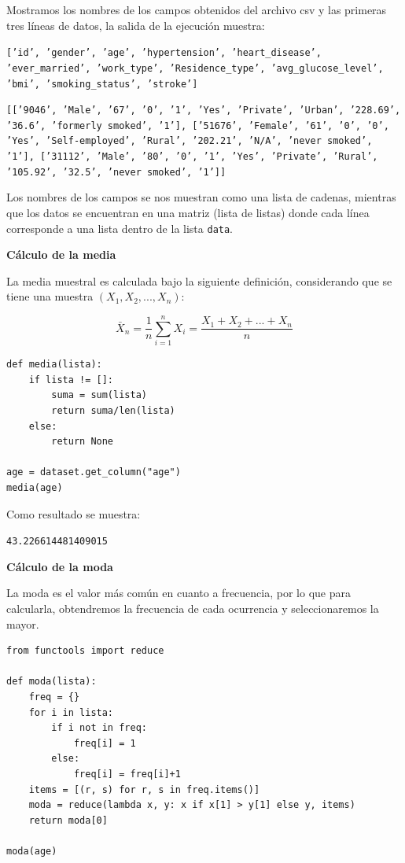 \documentclass[letter]{article}
\begin{document}
Mostramos los nombres de los campos obtenidos del archivo csv y las primeras
tres líneas de datos, la salida de la ejecución muestra:

\texttt{['id', 'gender', 'age', 'hypertension', 'heart\_disease', 'ever\_married', 'work\_type', 'Residence\_type', 'avg\_glucose\_level', 'bmi', 'smoking\_status', 'stroke']}

\texttt{[['9046', 'Male', '67', '0', '1', 'Yes', 'Private', 'Urban', '228.69', '36.6', 'formerly smoked', '1'], ['51676', 'Female', '61', '0', '0', 'Yes', 'Self-employed', 'Rural', '202.21', 'N/A', 'never smoked', '1'], ['31112', 'Male', '80', '0', '1', 'Yes', 'Private', 'Rural', '105.92', '32.5', 'never smoked', '1']]}

Los nombres de los campos se nos muestran como una lista de cadenas, mientras
que los datos se encuentran en una matriz (lista de listas) donde cada línea
corresponde a una lista dentro de la lista \texttt{data}.

\textbf{Cálculo de la media}

La media muestral es calculada bajo la siguiente definición, considerando que se tiene una muestra \((X_1, X_2, ..., X_n)\):

$$
\bar X_n = \frac{1}{n}\sum_{i=1}^{n}{X_i} = \frac{X_1+X_2+...+X_n}{n}
$$

\begin{verbatim}
def media(lista):
    if lista != []:
        suma = sum(lista)
        return suma/len(lista)
    else:
        return None

age = dataset.get_column("age")
media(age)
\end{verbatim}

Como resultado se muestra:

\texttt{43.226614481409015}

\textbf{Cálculo de la moda}

La moda es el valor más común en cuanto a frecuencia, por lo que para
calcularla, obtendremos la frecuencia de cada ocurrencia y seleccionaremos la
mayor.

\begin{verbatim}
from functools import reduce

def moda(lista):
    freq = {}
    for i in lista:
        if i not in freq:
            freq[i] = 1
        else:
            freq[i] = freq[i]+1
    items = [(r, s) for r, s in freq.items()]
    moda = reduce(lambda x, y: x if x[1] > y[1] else y, items)
    return moda[0]

moda(age)
\end{verbatim}
\end{document}
